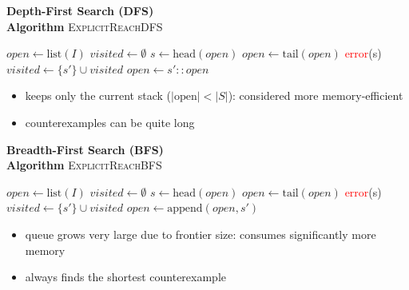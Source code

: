 \documentclass[a4paper, 11pt]{report}
\begin{document}
\noindent
\begin{minipage}[t]{0.48\textwidth}
\textbf{Depth-First Search (DFS)} \\
\textbf{Algorithm} \textsc{ExplicitReachDFS}
\begin{algorithmic}[1]
\State $open \gets \text{list}(I)$
\State $visited \gets \emptyset$
    \State $s \gets \text{head}(open)$
    \State $open \gets \text{tail}(open)$
        \State \textcolor{red}{error}(s)
    \EndIf
            \State $visited \gets \{s'\} \cup visited$
            \State $open \gets s' \mathbin{::} open$ 
        \EndIf
    \EndFor
\EndWhile
\end{algorithmic}

\vspace{1cm}
\begin{itemize}
    \item keeps only the current stack (\(|\text{open}| < |S|\)): considered more memory-efficient
    \item counterexamples can be quite long
\end{itemize}
\end{minipage}
\hfill
\begin{minipage}[t]{0.48\textwidth}
\textbf{Breadth-First Search (BFS)} \\
\textbf{Algorithm} \textsc{ExplicitReachBFS}
\begin{algorithmic}[1]
\State $open \gets \text{list}(I)$
\State $visited \gets \emptyset$
    \State $s \gets \text{head}(open)$
    \State $open \gets \text{tail}(open)$
        \State \textcolor{red}{error}(s)
    \EndIf
            \State $visited \gets \{s'\} \cup visited$
            \State $open \gets \text{append}(open, s')$ 
        \EndIf
    \EndFor
\EndWhile
\end{algorithmic}

\vspace{0.5cm}
\begin{itemize}
    \item queue grows very large due to frontier size: consumes significantly more memory
    \item always finds the shortest counterexample
\end{itemize}
\end{minipage}
\end{document}
